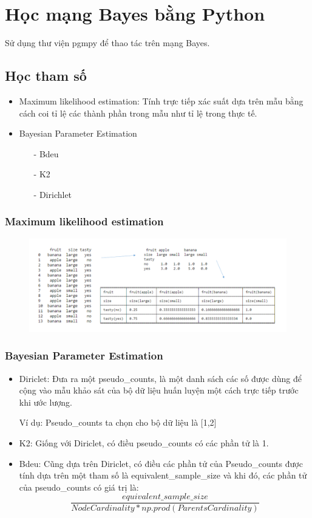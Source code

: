 \documentclass[12pt]{report}
\begin{document}
\section{Học mạng Bayes bằng Python}
Sử dụng thư viện pgmpy để thao tác trên mạng Bayes. 
\subsection{Học tham số}
\begin{itemize}
\item Maximum likelihood estimation: Tính trực tiếp xác suất dựa trên mẫu bằng cách coi tỉ lệ các thành phần trong mẫu như tỉ lệ trong thực tế.
\item Bayesian Parameter Estimation
\begin{itemize}
\item[-] Bdeu
\item[-] K2
\item[-] Dirichlet
\end{itemize}
\end{itemize}

\subsubsection{Maximum likelihood estimation}
\begin{figure}[h]
\centering
\includegraphics[width=\textwidth]{MLE.png}
\end{figure}
\subsubsection{Bayesian Parameter Estimation}
\begin{itemize}
\item Diriclet: Đưa ra một pseudo\_counts, là một danh sách các số được dùng để cộng vào mẫu khảo sát của bộ dữ liệu huấn luyện một cách trực tiếp trước khi ước lượng. 

Ví dụ: Pseudo\_counts ta chọn cho bộ dữ liệu là [1,2] 
\item K2: Giống với Diriclet, có điều pseudo\_counts có các phần tử là 1.
\item Bdeu: Cũng dựa trên Diriclet, có điều các phần tử của Pseudo\_counts được tính dựa trên một tham số là equivalent\_sample\_size và khi đó, các phần tử của pseudo\_counts có giá trị là:
$$ \frac{equivalent\_sample\_size}{NodeCardinality * np.prod(ParentsCardinality)}
$$
\end{itemize}
\end{document}
